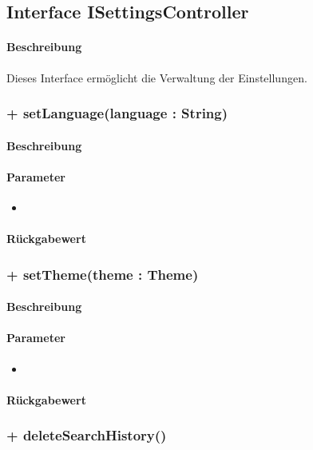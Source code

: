 \subsection{Interface ISettingsController}
\paragraph*{Beschreibung}
Dieses Interface ermöglicht die Verwaltung der Einstellungen.

\subsubsection{+ setLanguage(language : String)}%
\paragraph*{Beschreibung}

\paragraph*{Parameter}
\begin{itemize}
    \item 
\end{itemize}
\paragraph*{Rückgabewert}


\subsubsection{+ setTheme(theme : Theme)}%
\paragraph*{Beschreibung}

\paragraph*{Parameter}
\begin{itemize}
    \item 
\end{itemize}
\paragraph*{Rückgabewert}


\subsubsection{+ deleteSearchHistory()}%
